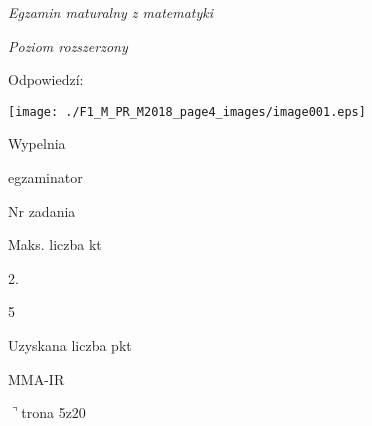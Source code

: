 \documentclass[a4paper,12pt]{article}
\begin{document}
{\it Egzamin maturalny z matematyki}

{\it Poziom rozszerzony}

Odpowiedzí:
\begin{center}
\texttt{[image: ./F1\_M\_PR\_M2018\_page4\_images/image001.eps]}
\end{center}
Wypelnia

egzaminator

Nr zadania

Maks. liczba kt

2.

5

Uzyskana liczba pkt

MMA-IR

$\urcorner$trona 5$\mathrm{z}20$
\end{document}
